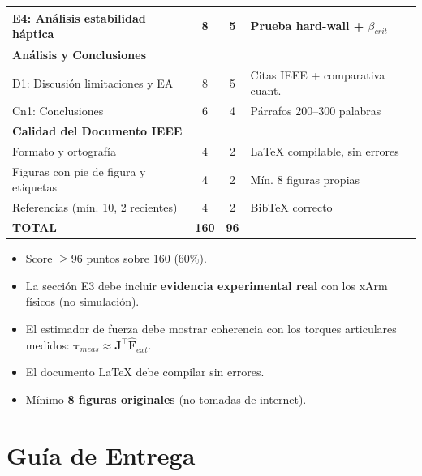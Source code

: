 \documentclass[journal,10pt,twoside]{IEEEtran}
\begin{document}
\begin{center}
\begin{tabular}{p{}ccp{}}
  E4: Análisis estabilidad háptica     & 8 & 5 & Prueba hard-wall + $\beta_{crit}$ \\
  \midrule
  \multicolumn{4}{l}{\textbf{Análisis y Conclusiones}} \\
  D1: Discusión limitaciones y EA     & 8 & 5 & Citas IEEE + comparativa cuant. \\
  Cn1: Conclusiones                   & 6 & 4 & Párrafos 200--300 palabras \\
  \midrule
  \multicolumn{4}{l}{\textbf{Calidad del Documento IEEE}} \\
  Formato y ortografía                & 4 & 2 & LaTeX compilable, sin errores \\
  Figuras con pie de figura y etiquetas & 4 & 2 & Mín. 8 figuras propias \\
  Referencias (mín. 10, 2 recientes)  & 4 & 2 & BibTeX correcto \\
  \midrule
  \rowcolor{tec_blue!15}
  \textbf{TOTAL} & \textbf{160} & \textbf{96} & \\
  \bottomrule
\end{tabular}
\end{center}

\begin{rubricbox}
  \begin{itemize}[itemsep=0.2em]
    \item Score $\geq 96$ puntos sobre 160 (60\%).
    \item La sección E3 debe incluir \textbf{evidencia experimental real}
          con los xArm físicos (no simulación).
    \item El estimador de fuerza debe mostrar coherencia con los torques
          articulares medidos: $\bm{\tau}_{meas} \approx \bm{J}^\top \hat{\bm{F}}_{ext}$.
    \item El documento LaTeX debe compilar sin errores.
    \item Mínimo \textbf{8 figuras originales} (no tomadas de internet).
  \end{itemize}
\end{rubricbox}

\section{Guía de Entrega}
\label{app:entrega}
\end{document}

